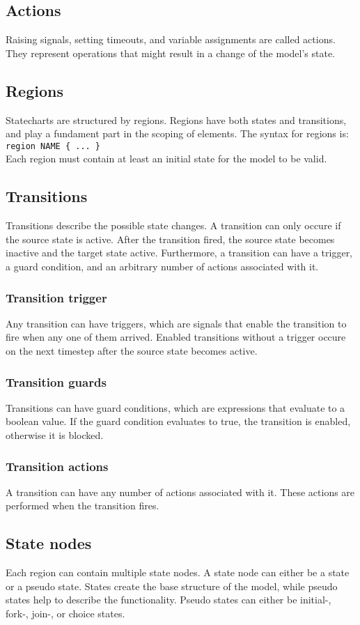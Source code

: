 \documentclass{book}
\begin{document}
{  \subsection{Actions}
Raising signals, setting timeouts, and variable assignments are called actions. They represent operations that might result in a change of the model's state.
  \subsection{Regions}
Statecharts are structured by regions. Regions have both states and transitions, and play a fundament part in the scoping of elements. The syntax for regions is: \\\verb!region NAME { ... }!\\ Each region must contain at least an initial state for the model to be valid.
  \subsection{Transitions}
Transitions describe the possible state changes. A transition can only occure if the source state is active. After the transition fired, the source state becomes inactive and the target state active. Furthermore, a transition can have a trigger, a guard condition, and an arbitrary number of actions associated with it.
    \subsubsection{Transition trigger}
Any transition can have triggers, which are signals that enable the transition to fire when any one of them arrived. Enabled transitions without a trigger occure on the next timestep after the source state becomes active.
    \subsubsection{Transition guards}
Transitions can have guard conditions, which are expressions that evaluate to a boolean value. If the guard condition evaluates to true, the transition is enabled, otherwise it is blocked.
    \subsubsection{Transition actions}
A transition can have any number of actions associated with it. These actions are performed when the transition fires.
  \subsection{State nodes}
Each region can contain multiple state nodes. A state node can either be a state or a pseudo state. States create the base structure of the model, while pseudo states help to describe the functionality. Pseudo states can either be initial-, fork-, join-, or choice states.
}
\end{document}
